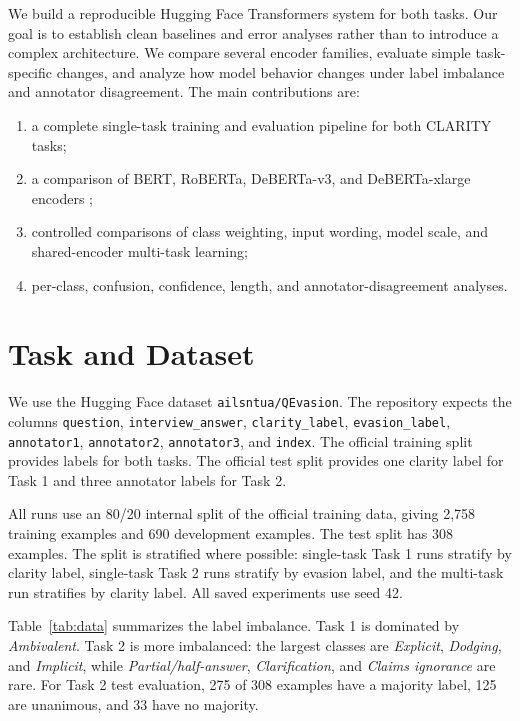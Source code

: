 \documentclass[11pt,twocolumn]{article}
\newcommand{\taskone}{Task 1}
\newcommand{\tasktwo}{Task 2}
\begin{document}
We build a reproducible Hugging Face Transformers system \citep{wolf2020transformers} for both tasks. Our goal is to establish clean baselines and error analyses rather than to introduce a complex architecture. We compare several encoder families, evaluate simple task-specific changes, and analyze how model behavior changes under label imbalance and annotator disagreement. The main contributions are:
\begin{enumerate}
    \item a complete single-task training and evaluation pipeline for both CLARITY tasks;
    \item a comparison of BERT, RoBERTa, DeBERTa-v3, and DeBERTa-xlarge encoders \citep{devlin2019bert,liu2019roberta,he2021deberta,he2021debertav3};
    \item controlled comparisons of class weighting, input wording, model scale, and shared-encoder multi-task learning;
    \item per-class, confusion, confidence, length, and annotator-disagreement analyses.
\end{enumerate}

\section{Task and Dataset}

We use the Hugging Face dataset \texttt{ailsntua/QEvasion}. The repository expects the columns \texttt{question}, \texttt{interview\_answer}, \texttt{clarity\_label}, \texttt{evasion\_label}, \texttt{annotator1}, \texttt{annotator2}, \texttt{annotator3}, and \texttt{index}. The official training split provides labels for both tasks. The official test split provides one clarity label for \taskone{} and three annotator labels for \tasktwo{}.

All runs use an 80/20 internal split of the official training data, giving 2,758 training examples and 690 development examples. The test split has 308 examples. The split is stratified where possible: single-task \taskone{} runs stratify by clarity label, single-task \tasktwo{} runs stratify by evasion label, and the multi-task run stratifies by clarity label. All saved experiments use seed 42.

Table~\ref{tab:data} summarizes the label imbalance. \taskone{} is dominated by \textit{Ambivalent}. \tasktwo{} is more imbalanced: the largest classes are \textit{Explicit}, \textit{Dodging}, and \textit{Implicit}, while \textit{Partial/half-answer}, \textit{Clarification}, and \textit{Claims ignorance} are rare. For \tasktwo{} test evaluation, 275 of 308 examples have a majority label, 125 are unanimous, and 33 have no majority.
\end{document}
